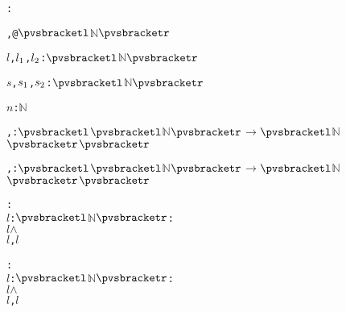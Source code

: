 \def\setsothermembertwofn#1#2{{(#1 \in #2)}}%
\def\opohtwofn#1#2{{#1\circ#2}}%
\def\opdividetwofn#1#2{{\frac{#1}{#2}}}%
\def\optimestwofn#1#2{{#1\times#2}}%
\def\opdifferenceonefn#1{{-#1}}%
\def\opdifferencetwofn#1#2{{#1-#2}}%
\def\opplustwofn#1#2{{#1+#2}}%
\begin{alltt}
: 

   , @\({\pvsbracketl}\)\(\mathbb{N}\)\({\pvsbracketr}\)

  \(l\), \(l\sb{1}\), \(l\sb{2}\):  \({\pvsbracketl}\)\(\mathbb{N}\)\({\pvsbracketr}\)\vspace*{\pvsdeclspacing}

  \(s\), \(s\sb{1}\), \(s\sb{2}\):  \({\pvsbracketl}\)\(\mathbb{N}\)\({\pvsbracketr}\)\vspace*{\pvsdeclspacing}

  \(n\):  \(\mathbb{N}\)\vspace*{\pvsdeclspacing}

  , : \({\pvsbracketl}\)\({\pvsbracketl}\)\(\mathbb{N}\)\({\pvsbracketr}\) \(\rightarrow\) \({\pvsbracketl}\)\(\mathbb{N}\)\({\pvsbracketr}\)\({\pvsbracketr}\)\vspace*{\pvsdeclspacing}

  , : \({\pvsbracketl}\)\({\pvsbracketl}\)\(\mathbb{N}\)\({\pvsbracketr}\) \(\rightarrow\) \({\pvsbracketl}\)\(\mathbb{N}\)\({\pvsbracketr}\)\({\pvsbracketr}\)\vspace*{\pvsdeclspacing}

  : 
     \pvsid{(}\(l\): \({\pvsbracketl}\)\(\mathbb{N}\)\({\pvsbracketr}\)\pvsid{)}:
      \pvsid{(}\pvsid{(}\(l\)\pvsid{)}\pvsid{)} \(\wedge\)
       \pvsid{(}\pvsid{(}\(l\)\pvsid{)}, \(l\)\pvsid{)}\vspace*{\pvsdeclspacing}

  : 
     \pvsid{(}\(l\): \({\pvsbracketl}\)\(\mathbb{N}\)\({\pvsbracketr}\)\pvsid{)}:
      \pvsid{(}\pvsid{(}\(l\)\pvsid{)}\pvsid{)} \(\wedge\)
       \pvsid{(}\(l\), \pvsid{(}\(l\)\pvsid{)}\pvsid{)}\vspace*{\pvsdeclspacing}


\end{alltt}
